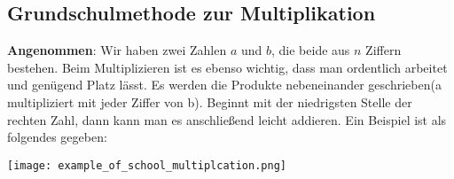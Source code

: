 \documentclass[11pt,a4paper, twoside]{article}
\newtheorem{corollary}[theorem]{Folgerung}
\theoremstyle{definition}
\begin{document}

\subsection{Grundschulmethode zur Multiplikation}
\textbf{Angenommen}: Wir haben zwei Zahlen \(a\) und \(b\), die beide aus \(n\) Ziffern bestehen. Beim Multiplizieren ist es ebenso wichtig, dass man ordentlich arbeitet und genügend Platz lässt. Es werden die Produkte nebeneinander geschrieben(a multipliziert mit jeder Ziffer von b). Beginnt mit der niedrigsten Stelle der rechten Zahl, dann kann man es anschließend leicht addieren. Ein Beispiel ist als folgendes gegeben: \\
\centerline{\texttt{[image: example\_of\_school\_multiplcation.png]}}
\end{document}
